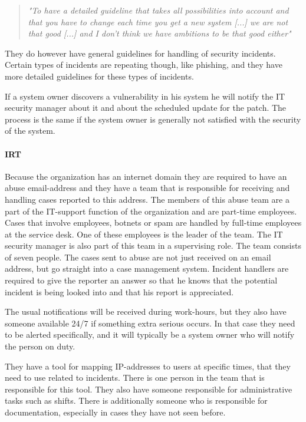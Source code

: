 \begin{quote}
\textit{"To have a detailed guideline that takes all possibilities into account and that you have to change each time you get a new system %
[...] we are not that good [...] and I don't think we have ambitions to be that good either"}
\end{quote}

They do however have general guidelines for handling of security incidents. Certain types of incidents are repeating though, like phishing, and they have more detailed guidelines for these types of incidents.

If a system owner discovers a vulnerability in his system he will notify the IT security manager about it and about the scheduled update for the patch. The process is the same if the system owner is generally not satisfied with the security of the system.

\paragraph{\acl{IRT}}
Because the organization has an internet domain they are required to have an abuse email-address and they have a team that is responsible for receiving and handling cases reported to this address. The members of this abuse team are a part of the IT-support function of the organization and are part-time employees. Cases that involve employees, botnets or spam are handled by full-time employees at the service desk. One of these employees is the leader of the team. The IT security manager is also part of this team in a supervising role. The team consists of seven people. The cases sent to abuse are not just received on an email address, but go straight into a case management system. Incident handlers are required to give the reporter an answer so that he knows that the potential incident is being looked into and that his report is appreciated.

The usual notifications will be received during work-hours, but they also have someone available 24/7 if something extra serious occurs. In that case they need to be alerted specifically, and it will typically be a system owner who will notify the person on duty.

They have a tool for mapping IP-addresses to users at specific times, that they need to use related to incidents. There is one person in the team that is responsible for this tool. They also have someone responsible for administrative tasks such as shifts. There is additionally someone who is responsible for documentation, especially in cases they have not seen before.

